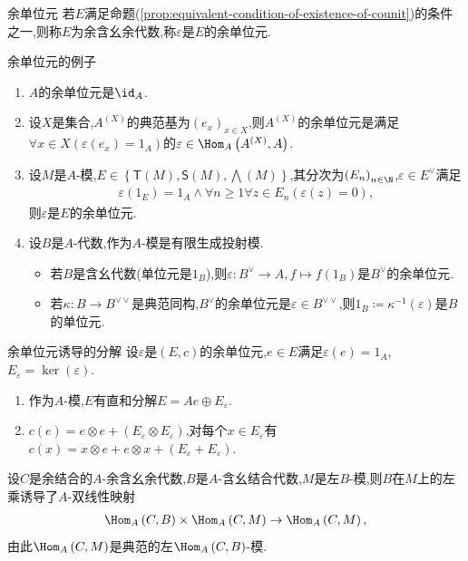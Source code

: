 \begin{definition}{余单位元}{}
	若$E$满足命题(\cref{prop:equivalent-condition-of-existence-of-counit})的条件之一,则称$E$为余含幺余代数,称$\varepsilon$是$E$的余单位元.
\end{definition}

\begin{example}{余单位元的例子}{}
	\begin{enumerate}
		\item $A$的余单位元是$\id_{A}$.
		\item 设$X$是集合,$A^{\left(X\right)}$的典范基为$\left(e_{x}\right)_{x\in X}$,则$A^{\left(X\right)}$的余单位元是满足$\forall x\in X\left(\varepsilon\left(e_{x}\right)=1_{A}\right)$的$\varepsilon\in\Hom_{A}\left(A^{\left(X\right)},A\right)$.
		\item 设$M$是$A$-模,$E\in\left\{\mathsf{T}\left(M\right),\mathsf{S}\left(M\right),\bigwedge\left(M\right)\right\}$,其分次为$\left(E_{n}\right)_{n\in\N}$,$\varepsilon\in E^{\vee}$满足
		\begin{align*}
			\varepsilon\left(1_{E}\right)=1_{A}\wedge\forall n\geq 1\forall z\in E_{n}\left(\varepsilon\left(z\right)=0\right),
		\end{align*}
		则$\varepsilon$是$E$的余单位元.
		\item 设$B$是$A$-代数,作为$A$-模是有限生成投射模.
		\begin{itemize}
			\item 若$B$是含幺代数(单位元是$1_{B}$),则$\varepsilon:B^{\vee}\to A,f\mapsto f\left(1_{B}\right)$是$B^{\vee}$的余单位元.
			\item 若$\kappa:B\to B^{\vee\vee}$是典范同构,$B^{\vee}$的余单位元是$\varepsilon\in B^{\vee\vee}$,则$1_{B}\coloneq\kappa^{-1}\left(\varepsilon\right)$是$B$的单位元.
		\end{itemize}
	\end{enumerate}
\end{example}

\begin{proposition}{余单位元诱导的分解}{}
	设$\varepsilon$是$\left(E,c\right)$的余单位元,$e\in E$满足$\varepsilon\left(e\right)=1_{A}$,$E_{\varepsilon}=\ker\left(\varepsilon\right)$.
	\begin{enumerate}
		\item 作为$A$-模,$E$有直和分解$E=Ae\oplus E_{\varepsilon}$.
		\item $c\left(e\right)=e\otimes e+\left(E_{\varepsilon}\otimes E_{\varepsilon}\right)$,对每个$x\in E_{\varepsilon}$有$c\left(x\right)=x\otimes e+e\otimes x+\left(E_{\varepsilon}+E_{\varepsilon}\right)$.
	\end{enumerate}
\end{proposition}

\begin{remark}{}{}
	设$C$是余结合的$A$-余含幺余代数,$B$是$A$-含幺结合代数,$M$是左$B$-模,则$B$在$M$上的左乘诱导了$A$-双线性映射
	\begin{align*}
		\Hom_{A}\left(C,B\right)\times\Hom_{A}\left(C,M\right)\to\Hom_{A}\left(C,M\right),
	\end{align*}
	由此$\Hom_{A}\left(C,M\right)$是典范的左$\Hom_{A}\left(C,B\right)$-模.
\end{remark}











